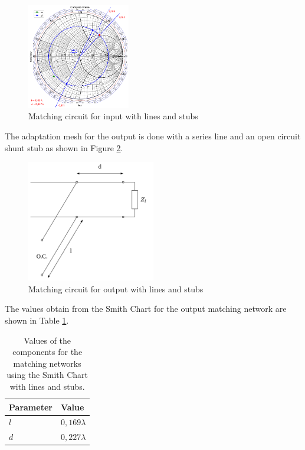 \begin{figure}[H]
    \centering
    \includegraphics[width=0.4\textwidth]{Images/zl-LS-matching.png}
    \caption{Matching circuit for input with lines and stubs}
    \label{fig:zl-line-matching}
\end{figure}

The adaptation mesh for the output is done with a series line and an open circuit shunt stub as shown in Figure \ref{fig:zl_LS_circuit}.

\begin{figure}[h]
    \centering
    \includegraphics[width=0.5\textwidth]{Images/zl_LS_circuit.png}
    \caption{Matching circuit for output with lines and stubs}
    \label{fig:zl_LS_circuit}
\end{figure}

The values obtain from the Smith Chart for the output matching network are shown in Table \ref{tab:MatchingValuesLinesout}.

\begin{table}[H]
    \centering
    \caption{Values of the components for the matching networks using the Smith Chart with lines and stubs.}
    \begin{tabularx}{\textwidth}{>{\centering\arraybackslash}X >{\centering\arraybackslash}X}
        \toprule
        \textbf{Parameter} & \textbf{Value} \\
        \midrule
        $l$     & $0,169\lambda$ \\
        \midrule
        $d$   & $0,227\lambda$ \\
        \bottomrule
    \end{tabularx}
    \label{tab:MatchingValuesLinesout}
\end{table}

